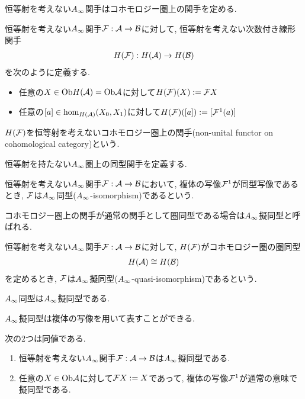 \documentclass[uplatex, a4paper, 14Q, dvipdfmx]{jsarticle}
\begin{document}
恒等射を考えない$\Ainf$関手はコホモロジー圏上の関手を定める. 

\begin{definition}[恒等射を考えないコホモロジー圏上の関手] \label{prop_F_induces_HF}
  恒等射を考えない$\Ainf$関手$\mathcal{F} : \mathcal{A} \to \mathcal{B}$に対して, 恒等射を考えない次数付き線形関手
  \begin{align*}
    H(\mathcal{F}) : H(\mathcal{A}) \to H(\mathcal{B})
  \end{align*}
  を次のように定義する.
  \begin{itemize}
    \item 任意の$X \in \mathrm{Ob} H(\mathcal{A}) = \mathrm{Ob}\mathcal{A}$に対して$H(\mathcal{F})(X) := \mathcal{F} X$
    \item 任意の$[a] \in \hom_{H(\mathcal{A})}(X_0,X_1)$に対して$H(\mathcal{F})([a]) := [\mathcal{F}^1(a)]$
  \end{itemize}
  $H(\mathcal{F})$を恒等射を考えないコホモロジー圏上の関手(non-unital functor on cohomological category)という.
\end{definition}

恒等射を持たない$\Ainf$圏上の同型関手を定義する. 

\begin{definition}[$\Ainf$同型]
  恒等射を考えない$\Ainf$関手$\mathcal{F} : \mathcal{A} \to \mathcal{B}$において, 複体の写像$\mathcal{F}^1$が同型写像であるとき, $\mathcal{F}$は$\Ainf$同型($\Ainf$-isomorphism)であるという.
\end{definition}

コホモロジー圏上の関手が通常の関手として圏同型である場合は$\Ainf$擬同型と呼ばれる. 

\begin{definition}
  恒等射を考えない$\Ainf$関手$\mathcal{F} : \mathcal{A} \to \mathcal{B}$に対して, $H(\mathcal{F})$がコホモロジー圏の圏同型
  \begin{align*}
    H(\mathcal{A}) \cong H(\mathcal{B})
  \end{align*}
  を定めるとき, $\mathcal{F}$は$\Ainf$擬同型($\Ainf$-quasi-isomorphism)であるという. 
\end{definition}

\begin{example}
  $\Ainf$同型は$\Ainf$擬同型である. 
\end{example}

$\Ainf$擬同型は複体の写像を用いて表すことができる. 

\begin{lemma}
  次の2つは同値である. 
  \begin{enumerate}
    \item 恒等射を考えない$\Ainf$関手$\mathcal{F} : \mathcal{A} \to \mathcal{B}$は$\Ainf$擬同型である. 
    \item 任意の$X \in \mathrm{Ob}\mathcal{A}$に対して$\mathcal{F} X := X$であって, 複体の写像$\mathcal{F}^1$が通常の意味で擬同型である. 
  \end{enumerate}
\end{lemma}
\end{document}
